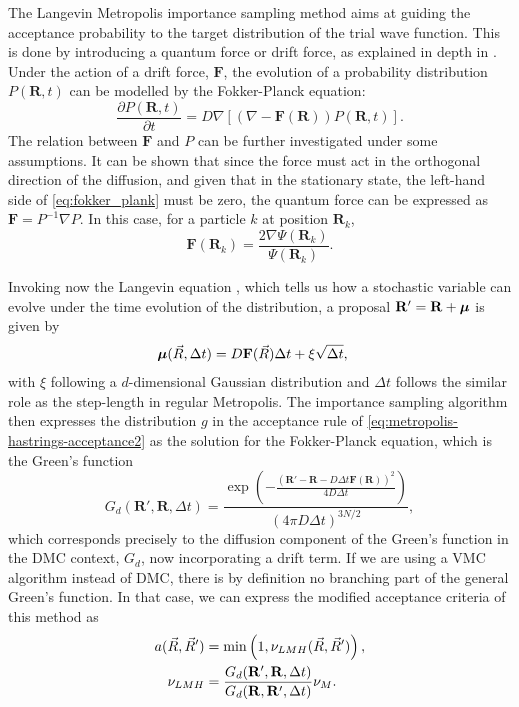 The Langevin Metropolis importance sampling method aims at guiding the acceptance probability to the target distribution of the trial wave function. This is done by introducing a quantum force or drift force, as explained in depth in \cite{chin1990langevinimportance}. Under the action of a drift force, $\mathbf{F}$, the evolution of a probability distribution $P(\mathbf{R}, t)$ can be modelled by the Fokker-Planck equation:
\begin{equation}
\frac{\partial P(\mathbf{R}, t)}{\partial t} = D\nabla\left[(\nabla - \mathbf{F}(\mathbf{R}))P(\mathbf{R}, t)\right].
\label{eq:fokker_plank}
\end{equation}
The relation between $\mathbf{F}$ and $P$ can be further investigated under some assumptions. It can be shown \cite{Fleisher2018} that since the force must act in the orthogonal direction of the diffusion, and given that in the stationary state, the left-hand side of \eqref{eq:fokker_plank} must be zero, the quantum force can be expressed as $\mathbf{F} = P^{-1}\nabla P$. In this case, for a particle $k$ at position $\mathbf{R}_k$,
\begin{equation*}
    \mathbf{F}(\mathbf{R}_k) = \frac{2\nabla\Psi(\mathbf{R}_k)}{\Psi(\mathbf{R}_k)}.
\end{equation*}

Invoking now the Langevin equation \cite{van1992stochastic}, which tells us how a stochastic variable can evolve under the time evolution of the distribution, a proposal $\mathbf{R}' = \mathbf{R} + \boldsymbol{\mu} $ is given by 
\begin{align}
    \boldsymbol{\mu}(\Vec{R}, \Delta t) &= D \mathbf{F}(\Vec{R})\Delta t +  \xi \sqrt{\Delta t} \label{eq:met:update_rule_metropolis_hastings},
\end{align}
with $\xi$ following a $d$-dimensional Gaussian distribution and $\Delta t$ follows the similar role as the step-length in regular Metropolis. The importance sampling algorithm then expresses the distribution $g$ in the acceptance rule of \eqref{eq:metropolis-hastrings-acceptance2} as the solution for the Fokker-Planck equation, which is the Green's function
\begin{equation}
    G_d(\mathbf{R}',\mathbf{R},\Delta t) = \frac{\exp{\left(-\frac{(\mathbf{R}'-\mathbf{R}-D\Delta t \mathbf{F}(\mathbf{R}))^2}{4D\Delta t}\right)}}{(4\pi D\Delta t)^{3N/2}}, \label{eq:met:metric_metropolis_hastings}
\end{equation}
which corresponds precisely to the diffusion component of the Green's function in the DMC context, $G_d$, now incorporating a drift term. If we are using a VMC algorithm instead of DMC, there is by definition no branching part of the general Green's function. In that case, we can express the modified acceptance criteria of this method as 
\begin{align}
    a(\Vec{R}, \Vec{R}') &= \min\left(1, \nu_{LMH}(\Vec{R}, \Vec{R}')\right), \notag\\
    \nu_{LMH}&=\frac{G_d(\mathbf{R}',\mathbf{R}, \Delta t)}{G_d(\mathbf{R}, \mathbf{R}', \Delta t)}\nu_M.
    \label{eq:acceptance_langevin_metro_def}
\end{align}

